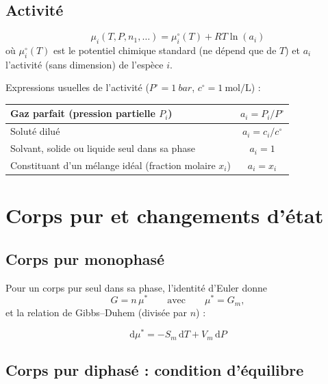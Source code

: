 \documentclass[11pt,a4paper]{article}
\newcommand{\dd}{\mathrm{d}}
\newcommand{\std}{^\circ}
\begin{document}
\subsection{Activité}

\begin{definition}[title={Définition de l'activité}]
\[
  \mu_i(T,P,n_1,\dots) = \mu_i\std(T) + RT\ln(a_i)
\]
où $\mu_i\std(T)$ est le potentiel chimique standard (ne dépend que de $T$) et
$a_i$ l'activité (sans dimension) de l'espèce $i$.
\end{definition}

Expressions usuelles de l'activité ($P\std = \SI{1}{bar}$,
$c\std = \SI{1}{\mole\per\liter}$) :
\begin{center}
\renewcommand{\arraystretch}{1.4}
\begin{tabular}{|l|c|}
  \hline
  Gaz parfait (pression partielle $P_i$) & $a_i = P_i/P\std$ \\
  \hline
  Soluté dilué & $a_i = c_i/c\std$ \\
  \hline
  Solvant, solide ou liquide seul dans sa phase & $a_i = 1$ \\
  \hline
  Constituant d'un mélange idéal (fraction molaire $x_i$) & $a_i = x_i$ \\
  \hline
\end{tabular}
\end{center}

\section{Corps pur et changements d'état}

\subsection{Corps pur monophasé}

Pour un corps pur seul dans sa phase, l'identité d'Euler donne
\[
  G = n\,\mu^* \qquad\text{avec}\qquad \mu^* = G_m ,
\]
et la relation de Gibbs--Duhem (divisée par $n$) :
\begin{resultat}
\[
  \dd\mu^* = -S_m\,\dd T + V_m\,\dd P
\]
\end{resultat}

\subsection{Corps pur diphasé : condition d'équilibre}
\end{document}
